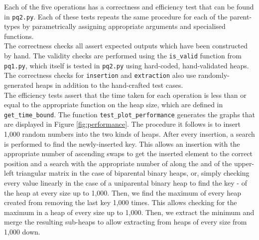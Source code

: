 \documentclass{article}
\begin{document}
Each of the five operations has a correctness and efficiency test that can be found in \texttt{pq2.py}. Each of these tests repeats the same procedure for each of the parent-types by parametrically assigning appropriate arguments and specialised functions. \\
The correctness checks all assert expected outputs which have been constructed by hand. The validity checks are performed using the \texttt{is\_valid} function from \texttt{pq1.py}, which itself is tested in \texttt{pq2.py} using hard-coded, hand-validated heaps. The correctness checks for \texttt{insertion} and \texttt{extraction} also use randomly-generated heaps in addition to the hand-crafted test cases. \\
The efficiency tests assert that the time taken for each operation is less than or equal to the appropriate function on the heap size, which are defined in \texttt{get\_time\_bound}. The function \texttt{test\_plot\_performance} generates the graphs that are displayed in Figure \ref{fig:performance}. The procedure it follows is to insert 1,000 random numbers into the two kinds of heaps. After every insertion, a search is performed to find the newly-inserted key. This allows an insertion with the appropriate number of ascending swaps to get the inserted element to the correct position and a search with the appropriate number of  along the  and  of the upper-left triangular matrix in the case of biparental binary heaps, or, simply checking every value linearly in the case of a uniparental binary heap to find the key - of the heap at every size up to 1,000. Then, we find the maximum of every heap created from removing the last key 1,000 times. This allows checking for the maximum in a heap of every size up to 1,000. Then, we extract the minimum and merge the resulting sub-heaps to allow extracting from heaps of every size from 1,000 down.
\end{document}
